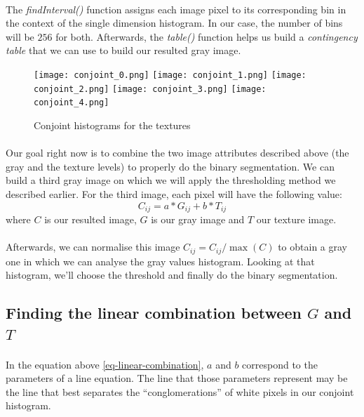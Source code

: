 \paragraph{}
The \emph{findInterval()} function assigns each image pixel to its corresponding bin in the context of the single dimension histogram.
In our case, the number of bins will be $256$ for both.
Afterwards, the \emph{table()} function helps us build a \emph{contingency table} that we can use to build our resulted gray image. \cite{r_documentation}
\begin{figure}[h]
    \centering
    \texttt{[image: conjoint\_0.png]}
    \texttt{[image: conjoint\_1.png]}
    \texttt{[image: conjoint\_2.png]}
    \texttt{[image: conjoint\_3.png]}
    \texttt{[image: conjoint\_4.png]}
    \caption{Conjoint histograms for the textures}
\end{figure}

\paragraph{}
Our goal right now is to combine the two image attributes described above (the gray and the texture levels) to properly do the binary segmentation.
We can build a third gray image on which we will apply the thresholding method we described earlier.
For the third image, each pixel will have the following value:
\label{eq-linear-combination}
$$C_{ij} = a * G_{ij} + b * T_{ij}$$
where $C$ is our resulted image, $G$ is our gray image and $T$ our texture image.

\paragraph{}
Afterwards, we can normalise this image $C_{ij} = C_{ij}/\max(C)$ to obtain a gray one in which we can analyse the gray values histogram.
Looking at that histogram, we'll choose the threshold and finally do the binary segmentation.

\subsection{Finding the linear combination between $G$ and $T$}
\paragraph{}
In the equation above \ref{eq-linear-combination}, $a$ and $b$ correspond to the parameters of a line equation.
The line that those parameters represent may be the line that best separates the ``conglomerations'' of white pixels in our conjoint histogram.


